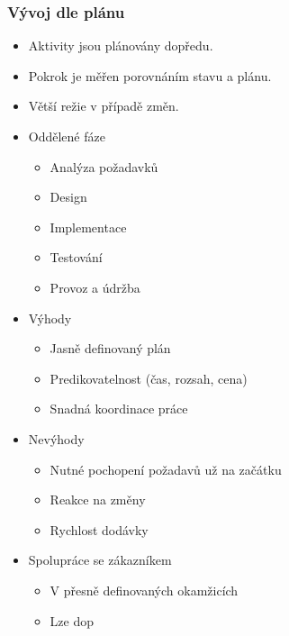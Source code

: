     \subsubsection{Vývoj dle plánu}
      \begin{itemize}
        \item Aktivity jsou plánovány dopředu.
        \item Pokrok je měřen porovnáním stavu a plánu.
        \item Větší režie v případě změn.
      \end{itemize}

        \begin{itemize}
          \item Oddělené fáze
            \begin{itemize}
              \item Analýza požadavků
              \item Design
              \item Implementace
              \item Testování
              \item Provoz a údržba
            \end{itemize}
          \item Výhody
            \begin{itemize}
              \item Jasně definovaný plán
              \item Predikovatelnost (čas, rozsah, cena)
              \item Snadná koordinace práce
            \end{itemize}
          \item Nevýhody
            \begin{itemize}
              \item Nutné pochopení požadavů už na začátku
              \item Reakce na změny
              \item Rychlost dodávky
            \end{itemize}
          \item Spolupráce se zákazníkem
            \begin{itemize}
              \item V přesně definovaných okamžicích
              \item Lze dop
            \end{itemize}
        \end{itemize}

